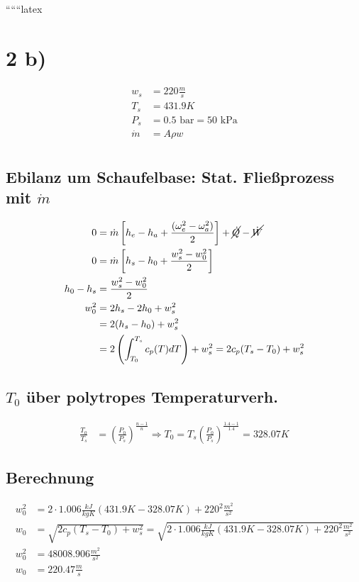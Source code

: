 ``````latex


\section*{2 b)}

\begin{align*}
w_s &= 220 \frac{m}{s} \\
T_s &= 431.9 K \\
P_s &= 0.5 \text{ bar} = 50 \text{ kPa} \\
\dot{m} &= A \rho w \\
\end{align*}


\subsection*{Ebilanz um Schaufelbase: Stat. Fließprozess mit $\dot{m}$}

\begin{align*}
0 &= \dot{m} \left[ h_e - h_a + \frac{(\omega_e^2 - \omega_a^2)}{2} \right] + \cancel{\dot{Q}} - \cancel{\dot{W}} \\
0 &= \dot{m} \left[ h_s - h_0 + \frac{w_s^2 - w_0^2}{2} \right] \\
h_0 - h_s &= \frac{w_s^2 - w_0^2}{2} \\
w_0^2 &= 2 h_s - 2 h_0 + w_s^2 \\
&= 2 (h_s - h_0) + w_s^2 \\
&= 2 \left( \int_{T_0}^{T_s} c_p(T) dT \right) + w_s^2 = 2 c_p (T_s - T_0) + w_s^2
\end{align*}

\subsection*{$T_0$ über polytropes Temperaturverh.}

\begin{align*}
\frac{T_0}{T_s} &= \left( \frac{P_0}{P_s} \right)^{\frac{n-1}{n}} \Rightarrow T_0 = T_s \left( \frac{P_0}{P_s} \right)^{\frac{1.4 - 1}{1.4}} = 328.07 K
\end{align*}

\subsection*{Berechnung}

\begin{align*}
w_0^2 &= 2 \cdot 1.006 \frac{kJ}{kgK} (431.9 K - 328.07 K) + 220^2 \frac{m^2}{s^2} \\
w_0 &= \sqrt{2 c_p (T_s - T_0) + w_s^2} = \sqrt{2 \cdot 1.006 \frac{kJ}{kgK} (431.9 K - 328.07 K) + 220^2 \frac{m^2}{s^2}} \\
w_0^2 &= 48008.906 \frac{m^2}{s^2} \\
w_0 &= 220.47 \frac{m}{s}
\end{align*}

